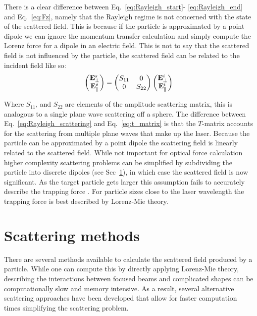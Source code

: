There is a clear difference between Eq.~\eqref{eq:Rayleigh_start}-
\eqref{eq:Rayleigh_end} and Eq.~\eqref{eq:Fz}, namely that the 
Rayleigh regime is not concerned with the state of the scattered
field. This is because if the particle is approximated by a point
dipole we can ignore the momentum transfer calculation and simply
compute the Lorenz force for a dipole in an electric field. This is 
not to say that the scattered field is not influenced by the particle, 
the scattered field can be related to the incident field like so:
\begin{align}
	\label{eq:Rayleigh_scattering}
	\begin{pmatrix}
		{\bf E}^s_\perp \\
		{\bf E}^s_\parallel 
	\end{pmatrix}
	= \begin{pmatrix}
		S_{11} & 0 \\
		0 & S_{22}
	\end{pmatrix}
	\begin{pmatrix}
		{\bf E}^i_\perp \\
		{\bf E}^i_\parallel
	\end{pmatrix}
\end{align}

\noindent
Where $S_{11}$, and $S_{22}$ are elements of the amplitude scattering 
matrix, this is analogous to a single plane wave scattering off a 
sphere. The difference between Eq.~\eqref{eq:Rayleigh_scattering} and
Eq.~\eqref{eq:t_matrix} is that the $T$-matrix accounts for the 
scattering from multiple plane waves that make up the laser. Because the 
particle can be approximated by a point dipole the scattering field is 
linearly related to the scattered field. While not important for optical 
force calculation higher complexity scattering problems can be simplified 
by subdividing the particle into discrete dipoles (see 
Sec~\ref{sec:scattering}), in which case the scattered field is now 
significant. As the target particle gets larger this assumption fails 
to accurately describe the trapping force \cite{Li2021}. For particle 
sizes close to the laser wavelength the trapping force is best described 
by Lorenz-Mie theory. 

\section{Scattering methods}
\label{sec:scattering}
There are several methods available to calculate the scattered field 
produced by a particle. While one can compute this by directly applying
Lorenz-Mie theory, describing the interactions between focused beams and 
complicated shapes can be computationally slow and memory intensive. As a
result, several alternative scattering approaches have been developed that
allow for faster computation times simplifying the scattering problem.
